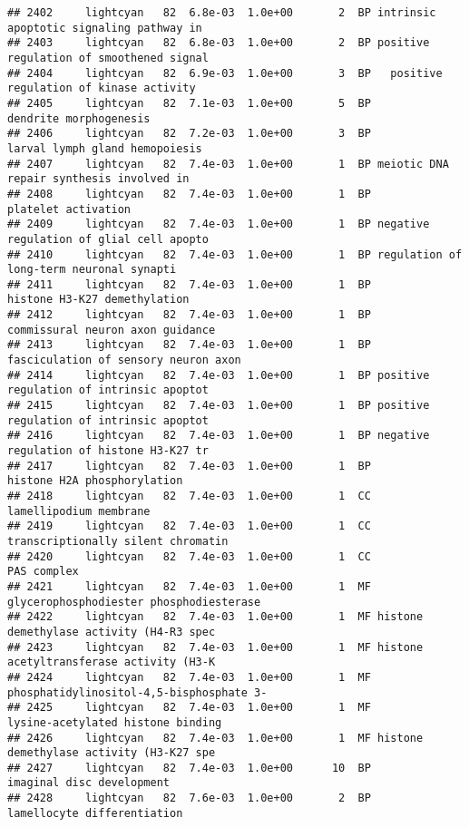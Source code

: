 \documentclass[]{article}
\begin{document}
\begin{verbatim}
## 2402     lightcyan   82  6.8e-03  1.0e+00       2  BP intrinsic apoptotic signaling pathway in
## 2403     lightcyan   82  6.8e-03  1.0e+00       2  BP positive regulation of smoothened signal
## 2404     lightcyan   82  6.9e-03  1.0e+00       3  BP   positive regulation of kinase activity
## 2405     lightcyan   82  7.1e-03  1.0e+00       5  BP                   dendrite morphogenesis
## 2406     lightcyan   82  7.2e-03  1.0e+00       3  BP           larval lymph gland hemopoiesis
## 2407     lightcyan   82  7.4e-03  1.0e+00       1  BP meiotic DNA repair synthesis involved in
## 2408     lightcyan   82  7.4e-03  1.0e+00       1  BP                      platelet activation
## 2409     lightcyan   82  7.4e-03  1.0e+00       1  BP negative regulation of glial cell apopto
## 2410     lightcyan   82  7.4e-03  1.0e+00       1  BP regulation of long-term neuronal synapti
## 2411     lightcyan   82  7.4e-03  1.0e+00       1  BP             histone H3-K27 demethylation
## 2412     lightcyan   82  7.4e-03  1.0e+00       1  BP         commissural neuron axon guidance
## 2413     lightcyan   82  7.4e-03  1.0e+00       1  BP     fasciculation of sensory neuron axon
## 2414     lightcyan   82  7.4e-03  1.0e+00       1  BP positive regulation of intrinsic apoptot
## 2415     lightcyan   82  7.4e-03  1.0e+00       1  BP positive regulation of intrinsic apoptot
## 2416     lightcyan   82  7.4e-03  1.0e+00       1  BP negative regulation of histone H3-K27 tr
## 2417     lightcyan   82  7.4e-03  1.0e+00       1  BP              histone H2A phosphorylation
## 2418     lightcyan   82  7.4e-03  1.0e+00       1  CC                   lamellipodium membrane
## 2419     lightcyan   82  7.4e-03  1.0e+00       1  CC       transcriptionally silent chromatin
## 2420     lightcyan   82  7.4e-03  1.0e+00       1  CC                              PAS complex
## 2421     lightcyan   82  7.4e-03  1.0e+00       1  MF glycerophosphodiester phosphodiesterase 
## 2422     lightcyan   82  7.4e-03  1.0e+00       1  MF histone demethylase activity (H4-R3 spec
## 2423     lightcyan   82  7.4e-03  1.0e+00       1  MF histone acetyltransferase activity (H3-K
## 2424     lightcyan   82  7.4e-03  1.0e+00       1  MF phosphatidylinositol-4,5-bisphosphate 3-
## 2425     lightcyan   82  7.4e-03  1.0e+00       1  MF        lysine-acetylated histone binding
## 2426     lightcyan   82  7.4e-03  1.0e+00       1  MF histone demethylase activity (H3-K27 spe
## 2427     lightcyan   82  7.4e-03  1.0e+00      10  BP                imaginal disc development
## 2428     lightcyan   82  7.6e-03  1.0e+00       2  BP              lamellocyte differentiation

\end{verbatim}
\end{document}
